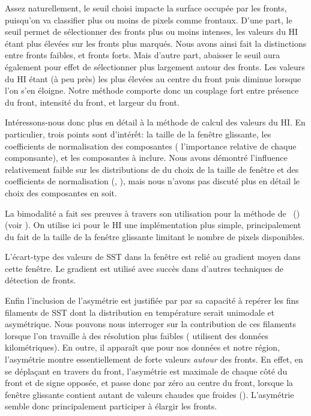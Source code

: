 Assez naturellement, le seuil choisi impacte la surface occupée par les fronts, puisqu'on va classifier plus ou moins de pixels comme frontaux.
D'une part, le seuil permet de sélectionner des fronts plus ou moins intenses, les valeurs du HI étant plus élevées sur les fronts plus marqués.
Nous avons ainsi fait la distinctions entre fronts faibles, et fronts forts.
Mais d'autre part, abaisser le seuil aura également pour effet de sélectionner plus largement autour des fronts.
Les valeurs du HI étant (à peu près) les plus élevées au centre du front puis diminue lorsque l'on s'en éloigne.
Notre méthode comporte donc un couplage fort entre présence du front, intensité du front, et largeur du front.

Intéressons-nous donc plus en détail à la méthode de calcul des valeurs du HI.
En particulier, trois points sont d'intérết: la taille de la fenêtre glissante, les coefficients de normalisation des composantes ( l'importance relative de chaque componsante), et les composantes à inclure.
Nous avons démontré l'influence relativement faible sur les distributions de  du choix de la taille de fenêtre et des coefficients de normalisation (, ), mais nous n'avons pas discuté plus en détail le choix des composantes en soit.

La bimodalité a fait ses preuves à travers son utilisation pour la méthode de ~() (voir ).
On utilise ici pour le HI une implémentation plus simple, principalement du fait de la taille de la fenêtre glissante limitant le nombre de pixels disponibles.

L'écart-type des valeurs de SST dans la fenêtre est relié au gradient moyen dans cette fenêtre.
Le gradient est utilisé avec succès dans d'autres techniques de détection de fronts.

Enfin l'inclusion de l'asymétrie est justifiée par \textcite{liu_2016} par sa capacité à repérer les fins filaments de SST dont la distribution en température serait unimodale et asymétrique.
Nous pouvons nous interroger sur la contribution de ces filaments lorsque l'on travaille à des résolution plus faibles (\citeauthor{liu_2016} utilisent des données kilométriques).
En outre, il apparaît que pour nos données et notre région, l'asymétrie montre essentiellement de forte valeurs \emph{autour} des fronts.
En effet, en se déplaçant en travers du front, l'asymétrie est maximale de chaque côté du front et de signe opposée, et passe donc par zéro au centre du front, lorsque la fenêtre glissante contient autant de valeurs chaudes que froides ().
L'asymétrie semble donc principalement participer à élargir les fronts.

